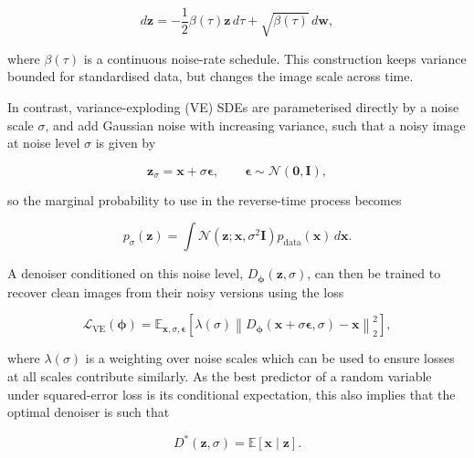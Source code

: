 \begin{equation}
d\mathbf{z}=-\frac{1}{2}\beta(\tau)\mathbf{z}\,d\tau+\sqrt{\beta(\tau)}\,d\mathbf{w},
\label{eq:vp_sde}
\end{equation}

where $\beta(\tau)$ is a continuous noise-rate schedule. This construction keeps variance bounded for standardised data, but changes the image scale across time.

In contrast, variance-exploding (VE) SDEs are parameterised directly by a noise scale $\sigma$, and add Gaussian noise with increasing variance, such that a noisy image at noise level $\sigma$ is given by

\begin{equation}
\mathbf{z}_\sigma=\mathbf{x}+\sigma\boldsymbol{\epsilon}, \qquad \boldsymbol{\epsilon}\sim\mathcal{N}(\mathbf{0},\mathbf{I}),
\label{eq:ve_noisy_image}
\end{equation}

so the marginal probability to use in the reverse-time process becomes

\begin{equation}
p_\sigma(\mathbf{z})=\int \mathcal{N}(\mathbf{z};\mathbf{x},\sigma^2\mathbf{I})p_{\mathrm{data}}(\mathbf{x})\,d\mathbf{x}.
\label{eq:ve_marginal}
\end{equation}

A denoiser conditioned on this noise level, $D_{\boldsymbol{\phi}}(\mathbf{z}, \sigma)$, can then be trained to recover clean images from their noisy versions using the loss

\begin{equation}
\mathcal L_{\mathrm{VE}}(\boldsymbol{\phi})=
\mathbb E_{\mathbf{x},\sigma,\boldsymbol{\epsilon}}
\left[
\lambda(\sigma)
\left\|D_{\boldsymbol{\phi}}(\mathbf{x}+\sigma\boldsymbol{\epsilon},\sigma)-\mathbf{x}\right\|_2^2
\right],
\label{eq:ve_denoising_loss}
\end{equation}

where $\lambda(\sigma)$ is a weighting over noise scales which can be used to ensure losses at all scales contribute similarly. As the best predictor of a random variable under squared-error loss is its conditional expectation, this also implies that the optimal denoiser is such that

\begin{equation}
D^*(\mathbf{z},\sigma)=\mathbb E[\mathbf{x}\mid \mathbf{z}].
\label{eq:optimal_denoiser_conditional_mean}
\end{equation}

